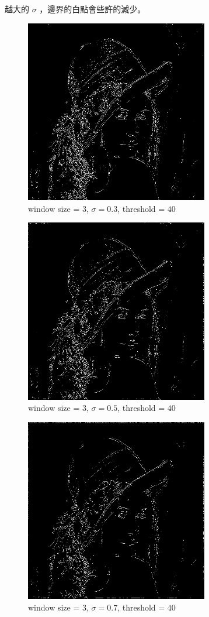 \documentclass[conference]{IEEEtran}
\begin{document}
越大的 $\sigma$ ，邊界的白點會些許的減少。

\begin{figure}[H]
\centerline{\includegraphics[width=8cm]{lena04.png}}
\caption{window size = $3$, $\sigma=0.3$,  threshold = $40$}
\label{lena04}
\end{figure}

\begin{figure}[H]
\centerline{\includegraphics[width=8cm]{lena05.png}}
\caption{window size = $3$, $\sigma=0.5$,  threshold = $40$}
\label{lena05}
\end{figure}

\begin{figure}[H]
\centerline{\includegraphics[width=8cm]{lena06.png}}
\caption{window size = $3$, $\sigma=0.7$,  threshold = $40$}
\label{lena06}
\end{figure}
\end{document}
